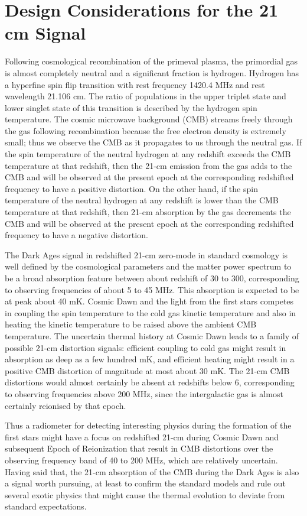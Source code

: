 \section{Design Considerations for the 21\,cm Signal}

Following cosmological recombination of the primeval plasma, the primordial gas is almost completely neutral and a significant fraction is hydrogen.  Hydrogen has a hyperfine spin flip transition with rest frequency 1420.4 MHz and rest wavelength 21.106 cm.  The ratio of populations in the upper triplet state and lower singlet state of this transition is described by the hydrogen spin temperature.  The cosmic microwave background (CMB) streams freely through the gas following recombination because the free electron density is extremely small; thus we observe the CMB as it propagates to us through the neutral gas.   If the spin temperature of the neutral hydrogen at any redshift exceeds the CMB temperature at that redshift, then the 21-cm emission from the gas adds to the CMB and will be observed at the present epoch at the corresponding redshifted frequency to have a positive distortion.  On the other hand, if the spin temperature of the neutral hydrogen at any redshift is lower than the CMB temperature at that redshift, then 21-cm absorption by the gas decrements the CMB and will be observed at the present epoch at the corresponding redshifted frequency to have a negative distortion.

The Dark Ages signal in redshifted 21-cm zero-mode in standard cosmology is well defined by the cosmological parameters and the matter power spectrum to be a broad absorption feature between about redshift of 30 to 300, corresponding to observing frequencies of about 5 to 45 MHz. This absorption is expected to be at peak about 40 mK.  Cosmic Dawn and the light from the first stars competes in coupling the spin temperature to the cold gas kinetic temperature and also in heating the kinetic temperature to be raised above the ambient CMB temperature.  The uncertain thermal history at Cosmic Dawn leads to a family of possible 21-cm distortion signals: efficient coupling to cold gas might result in absorption as deep as a few hundred mK, and efficient heating might result in a positive CMB distortion of magnitude at most about 30 mK.  The 21-cm CMB distortions would almost certainly be absent at redshifts below 6, corresponding to observing frequencies above 200 MHz, since the intergalactic gas is almost certainly reionised by that epoch.  

Thus a radiometer for detecting interesting physics during the formation of the first stars might have a focus on redshifted 21-cm during Cosmic Dawn and subsequent Epoch of Reionization that result in CMB distortions over the observing frequency band of 40 to 200 MHz, which are relatively uncertain.  Having said that, the 21-cm absorption of the CMB during the Dark Ages is also a signal worth pursuing, at least to confirm the standard models and rule out several exotic physics that might cause the thermal evolution to deviate from standard expectations. 

